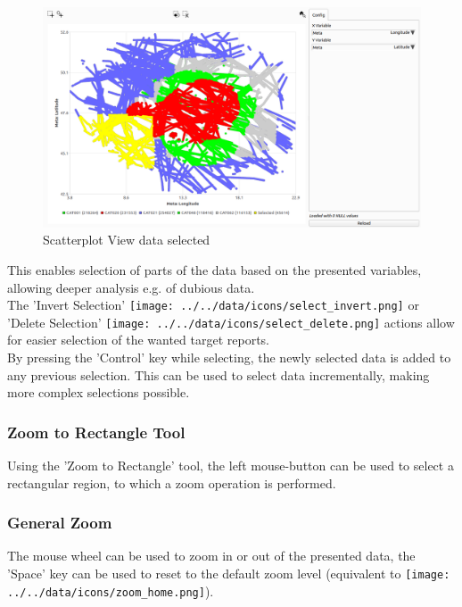 \begin{figure}[H]
    \hspace*{-2cm}
    \includegraphics[width=18cm,frame]{figures/scatter_selected.png}
  \caption{Scatterplot View data selected}
\end{figure}

This enables selection of parts of the data based on the presented variables, allowing deeper analysis e.g. of dubious data. \\

The 'Invert Selection' \texttt{[image: ../../data/icons/select\_invert.png]} or 'Delete Selection' \texttt{[image: ../../data/icons/select\_delete.png]} actions 
allow for easier selection of the wanted target reports. \\

By pressing the 'Control' key while selecting, the newly selected data is added to any previous selection. This can be used to select data incrementally, making more complex selections possible.

\subsubsection{Zoom to Rectangle Tool}

Using the 'Zoom to Rectangle' tool, the left mouse-button can be used to select a rectangular region, to which a zoom operation is performed.

\subsubsection{General Zoom}

The mouse wheel can be used to zoom in or out of the presented data, the 'Space' key can be used to reset to the default zoom level (equivalent to \texttt{[image: ../../data/icons/zoom\_home.png]}).
